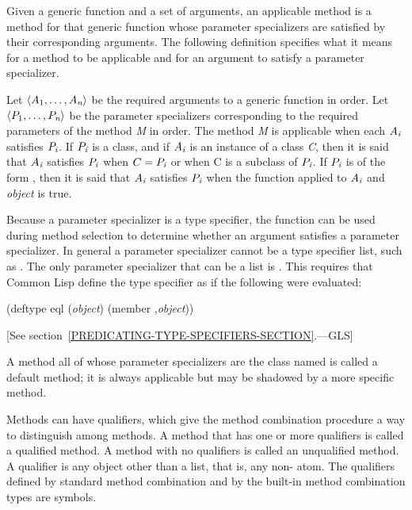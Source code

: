 Given a generic function and a set of arguments, an {\bit applicable
method\/} is a method for that generic function whose parameter
specializers are satisfied by their corresponding arguments.  The
following definition specifies what it means for a method to be
applicable and for an argument to satisfy a parameter specializer.

Let $\langle A_ 1, \ldots, A_ {\hbox{\scriptsize\it n}}\rangle$ be the required
arguments to a generic function in order. Let $\langle P_ 1,
\ldots, P_ {\hbox{\scriptsize\it n}}\rangle$ be the parameter specializers corresponding to
the required parameters of the method \emph{M} in order.  The method \emph{M} is
{\bit applicable\/} when each $A_ {\hbox{\scriptsize\it i}}$
{\bit satisfies\/} $P_ {\hbox{\scriptsize\it i}}$.
If $P_ {\hbox{\scriptsize\it i}}$ is a class,
and if $A_ {\hbox{\scriptsize\it i}}$ is an instance of a class
\emph{C}, then it is said that $A_ {\hbox{\scriptsize\it i}}$ {\bit satisfies\/}
$P_ {\hbox{\scriptsize\it i}}$ when $C=P_ {\hbox{\scriptsize\it i}}$ or when C is a subclass of $P_ {\hbox{\scriptsize\it i}}$.  If
$P_ {\hbox{\scriptsize\it i}}$ is of the form
, then it is said that
$A_ {\hbox{\scriptsize\it i}}$ satisfies $P_ {\hbox{\scriptsize\it i}}$
when the function  applied to
$A_ {\hbox{\scriptsize\it i}}$ and \emph{object} is true.

Because a parameter specializer is a type specifier, the function 
 can be used during method selection to determine whether an
argument satisfies a parameter specializer.  In general a
parameter specializer cannot be a type specifier list, such as 
.  The only parameter specializer that can
be a list is .  This requires that
Common Lisp define the type specifier 
as if the following were evaluated:

\begin{lisp}
(deftype eql (\emph{object\/}) {\Xbq}(member ,\emph{object\/}))
\end{lisp}
[See section~\ref{PREDICATING-TYPE-SPECIFIERS-SECTION}.---GLS]

A method all of whose parameter specializers are the class named 
 is called a {\bit default method}; it is always applicable but
may be shadowed by a more specific method.

Methods can have {\bit qualifiers}, which give the method combination
procedure a way to distinguish among methods.  A method that has one
or more qualifiers is called a {\bit qualified\/} method.
A method with no qualifiers is called an {\bit unqualified method}. 
A qualifier is any object other than a list, that is,
any non- atom.  The qualifiers defined by standard method combination
and by the built-in method combination types are symbols.

